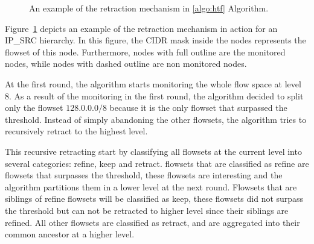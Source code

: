 \begin{figure}
	\centering
    \hfill
\caption{An example of the retraction mechanism in \ref{algo:htf} Algorithm.}
\label{fig:retract}

\end{figure}

Figure~\ref{fig:retract} depicts an example of the retraction mechanism in action for an IP\_SRC hierarchy. In this figure, the CIDR mask inside the nodes represents the flowset of this node. Furthermore, nodes with full outline are the monitored nodes, while nodes with dashed outline are non monitored nodes.

At the first round, the algorithm starts monitoring the whole flow space at level 8. As a result of the monitoring in the first round, the algorithm decided to split only the flowset $128.0.0.0/8$ because it is the only flowset that surpassed the threshold. Instead of simply abandoning the other flowsets, the algorithm tries to recursively retract to the highest level.

This recursive retracting start by classifying all flowsets at the current level into several categories: refine, keep and retract. flowsets that are classified as refine are flowsets that surpasses the threshold, these flowsets are interesting and the algorithm  partitions them in a lower level at the next round. Flowsets that are siblings of refine flowsets will be classified as keep, these flowsets did not surpass the threshold but can not be retracted to higher level since their siblings are refined. All other flowsets are classified as retract, and are aggregated into their common ancestor at a higher level.

